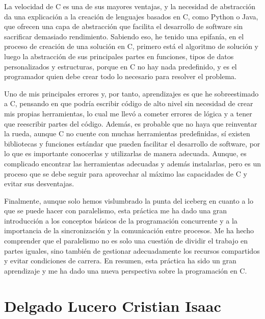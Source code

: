 La velocidad de C es una de sus mayores ventajas, y la necesidad de abstracción da una explicación a la creación de lenguajes basados en C, como Python o Java, que ofrecen una capa de abstracción que facilita el desarrollo de software sin sacrificar demasiado rendimiento. Sabiendo eso, he tenido una epifanía, en el proceso de creación de una solución en C, primero está el algoritmo de solución y luego la abstracción de sus principales partes en funciones, tipos de datos personalizados y estructuras, porque en C no hay nada predefinido, y es el programador quien debe crear todo lo necesario para resolver el problema. 

Uno de mis principales errores y, por tanto, aprendizajes es que he sobreestimado a C, pensando en que podría escribir código de alto nivel sin necesidad de crear mis propias herramientas, lo cual me llevó a cometer errores de lógica y a tener que reescribir partes del código. Además, es probable que no haya que reinventar la rueda, aunque C no cuente con muchas herramientas predefinidas, sí existen bibliotecas y funciones estándar que pueden facilitar el desarrollo de software, por lo que es importante conocerlas y utilizarlas de manera adecuada. Aunque, es complicado encontrar las herramientas adecuadas y además instalarlas, pero es un proceso que se debe seguir para aprovechar al máximo las capacidades de C y evitar sus desventajas.

Finalmente, aunque solo hemos vislumbrado la punta del iceberg en cuanto a lo que se puede hacer con paralelismo, esta práctica me ha dado una gran introducción a los conceptos básicos de la programación concurrente y a la importancia de la sincronización y la comunicación entre procesos. Me ha hecho comprender que el paralelismo no es solo una cuestión de dividir el trabajo en partes iguales, sino también de gestionar adecuadamente los recursos compartidos y evitar condiciones de carrera. En resumen, esta práctica ha sido un gran aprendizaje y me ha dado una nueva perspectiva sobre la programación en C.

\newpage
\section{Delgado Lucero Cristian Isaac}


